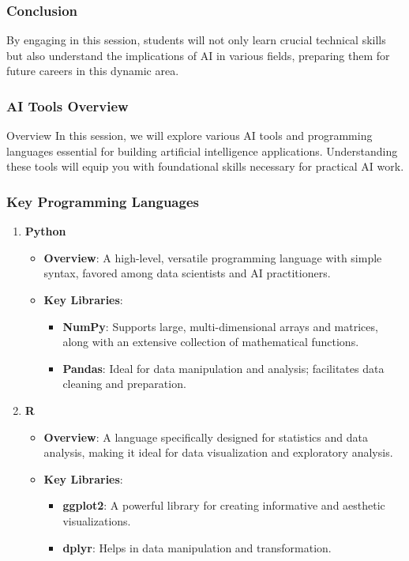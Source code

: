 \documentclass{beamer}
\begin{document}
\begin{frame}
    \frametitle{Conclusion}
    By engaging in this session, students will not only learn crucial technical skills but also understand the implications of AI in various fields, preparing them for future careers in this dynamic area.
\end{frame}

\begin{frame}
    \frametitle{AI Tools Overview}
    \begin{block}{Overview}
        In this session, we will explore various AI tools and programming languages essential for building artificial intelligence applications. Understanding these tools will equip you with foundational skills necessary for practical AI work.
    \end{block}
\end{frame}

\begin{frame}
    \frametitle{Key Programming Languages}
    \begin{enumerate}
        \item \textbf{Python}
        \begin{itemize}
            \item \textbf{Overview}: A high-level, versatile programming language with simple syntax, favored among data scientists and AI practitioners.
            \item \textbf{Key Libraries}:
            \begin{itemize}
                \item \textbf{NumPy}: Supports large, multi-dimensional arrays and matrices, along with an extensive collection of mathematical functions.
                \item \textbf{Pandas}: Ideal for data manipulation and analysis; facilitates data cleaning and preparation.
            \end{itemize}
        \end{itemize}

        \item \textbf{R}
        \begin{itemize}
            \item \textbf{Overview}: A language specifically designed for statistics and data analysis, making it ideal for data visualization and exploratory analysis.
            \item \textbf{Key Libraries}:
            \begin{itemize}
                \item \textbf{ggplot2}: A powerful library for creating informative and aesthetic visualizations.
                \item \textbf{dplyr}: Helps in data manipulation and transformation.
            \end{itemize}
        \end{itemize}
    \end{enumerate}
\end{frame}
\end{document}
